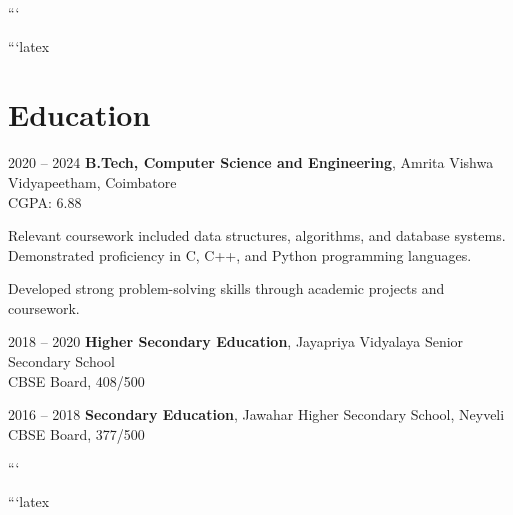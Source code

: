 ```

```latex
\section{Education}
\begin{twocolentry}{2020 -- 2024}
    \textbf{B.Tech, Computer Science and Engineering}, Amrita Vishwa Vidyapeetham, Coimbatore\\ CGPA: 6.88
\end{twocolentry}
\vspace{0.10 cm}
\begin{onecolentry}
    \begin{highlights}
        \item Relevant coursework included data structures, algorithms, and database systems.  Demonstrated proficiency in C, C++, and Python programming languages.
        \item  Developed strong problem-solving skills through academic projects and coursework.
    \end{highlights}
\end{onecolentry}
\vspace{0.10 cm}
\begin{twocolentry}{2018 -- 2020}
    \textbf{Higher Secondary Education}, Jayapriya Vidyalaya Senior Secondary School \\ CBSE Board, 408/500
\end{twocolentry}
\vspace{0.10 cm}
\begin{twocolentry}{2016 -- 2018}
    \textbf{Secondary Education}, Jawahar Higher Secondary School, Neyveli \\ CBSE Board, 377/500
\end{twocolentry}

```

```latex
